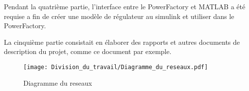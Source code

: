 	Pendant la quatrième partie, l'interface entre le PowerFactory et MATLAB a été requise a fin de créer une modèle de régulateur au simulink et utiliser dans le PowerFactory.
\pagebreak

La cinquième partie consistait en élaborer des rapports et autres documents de description du projet, comme ce document par exemple.

\begin{figure}[H]
	\begin{center}	
		\texttt{[image: Division\_du\_travail/Diagramme\_du\_reseaux.pdf]}
		\caption{Diagramme du reseaux}
		\label{fig:Diagramme_du_reseaux}
	\end{center}
\end{figure}
\newpage